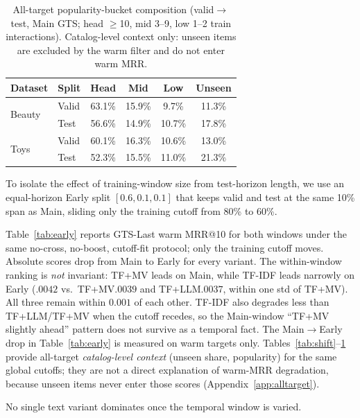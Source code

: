 \documentclass[sigconf,natbib=true,anonymous]{acmart}
\newcommand{\tfidf}{\textsc{TF-IDF}\xspace}
\newcommand{\tfllm}{\textsc{TF+LLM}\xspace}
\newcommand{\tfmv}{\textsc{TF+MV}\xspace}
\begin{document}
\begin{table}[t]
\centering
\caption{%
All-target popularity-bucket composition (valid$\to$test, Main GTS; head $\ge$10, mid 3--9, low 1--2 train interactions).
Catalog-level context only: unseen items are excluded by the warm filter and do not enter warm MRR.%
}
\label{tab:bucket}
\small
\setlength{\tabcolsep}{3.5pt}
\begin{tabular}{@{}llcccc@{}}
\toprule
Dataset & Split & Head & Mid & Low & Unseen \\
\midrule
\multirow{2}{*}{Beauty}
 & Valid & 63.1\% & 15.9\% & 9.7\% & 11.3\% \\
 & Test  & 56.6\% & 14.9\% & 10.7\% & 17.8\% \\
\midrule
\multirow{2}{*}{Toys}
 & Valid & 60.1\% & 16.3\% & 10.6\% & 13.0\% \\
 & Test  & 52.3\% & 15.5\% & 11.0\% & 21.3\% \\
\bottomrule
\end{tabular}
\end{table}

To isolate the effect of training-window size from test-horizon length, we use an equal-horizon Early split $[0.6, 0.1, 0.1]$ that keeps valid and test at the same 10\% span as Main, sliding only the training cutoff from 80\% to 60\%.

Table~\ref{tab:early} reports GTS-Last warm MRR@10 for both windows under the same no-cross, no-boost, cutoff-fit protocol; only the training cutoff moves.
Absolute scores drop from Main to Early for every variant.
The within-window ranking is \emph{not} invariant: \tfmv leads on Main, while \tfidf leads narrowly on Early ($.0042$ vs.\ \tfmv $.0039$ and \tfllm $.0037$, within one std of \tfmv).
All three remain within $0.001$ of each other.
\tfidf also degrades less than \tfllm/\tfmv when the cutoff recedes, so the Main-window ``\tfmv slightly ahead'' pattern does not survive as a temporal fact.
The Main$\to$Early drop in Table~\ref{tab:early} is measured on warm targets only.
Tables~\ref{tab:shift}--\ref{tab:bucket} provide all-target \emph{catalog-level context} (unseen share, popularity) for the same global cutoffs; they are not a direct explanation of warm-MRR degradation, because unseen items never enter those scores (Appendix~\ref{app:alltarget}).

No single text variant dominates once the temporal window is varied.
\end{document}
